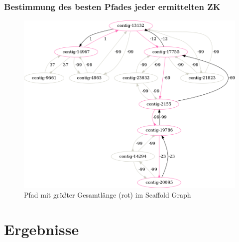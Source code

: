 \documentclass[xcolor=pst]{beamer}
\begin{document}
\begin{frame}
  \frametitle{Bestimmung des besten Pfades jeder ermittelten ZK}
  \begin{center}
    \begin{figure}
      \includegraphics[width=\textwidth,height=0.7\textheight,keepaspectratio]{figures/s_cerevisiae_make_scaffold_example_small.png}
      \caption{Pfad mit größter Gesamtlänge (rot) im Scaffold Graph}
    \end{figure}
  \end{center}
\end{frame}

\section{Ergebnisse}
\end{document}
